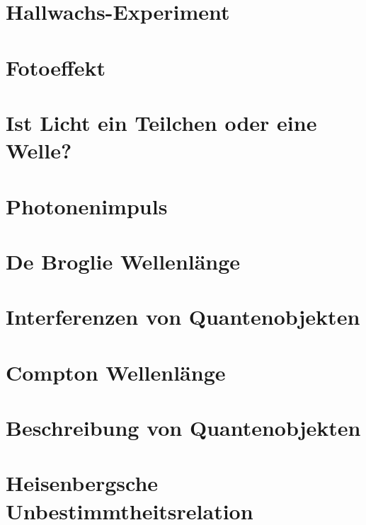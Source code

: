 \section{Hallwachs-Experiment} \label{sec:hallwachs}


\section{Fotoeffekt} \label{sec:fotoeffekt}


\section{Ist Licht ein Teilchen oder eine Welle?} \label{sec:lichtteilchenwelle}


\section{Photonenimpuls} \label{sec:photonenimpuls}


\section{De Broglie Wellenlänge} \label{sec:debroglie}


\section{Interferenzen von Quantenobjekten} \label{sec:interferenzenquanten}


\section{Compton Wellenlänge} \label{sec:compton}


\section{Beschreibung von Quantenobjekten} \label{sec:beschreibungquanten}


\section{Heisenbergsche Unbestimmtheitsrelation} \label{sec:unbestimmtheitsrelation}


